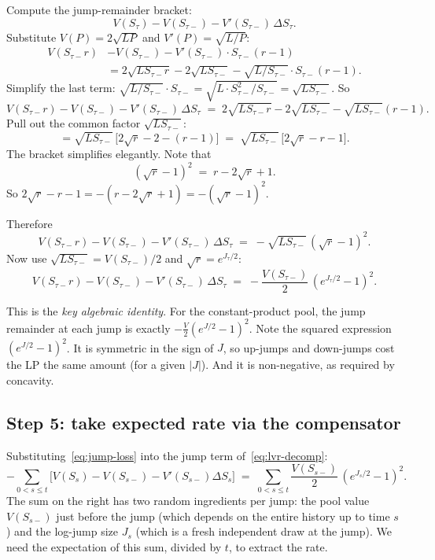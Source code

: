 \documentclass[11pt]{article}
\theoremstyle{definition}
\theoremstyle{remark}
\newcommand{\1}{\mathbf{1}}
\begin{document}
Compute the jump-remainder bracket:
\[
V(S_\tau) - V(S_{\tau-}) - V'(S_{\tau-})\,\Delta S_\tau.
\]
Substitute $V(P) = 2\sqrt{LP}$ and $V'(P) = \sqrt{L/P}$:
\begin{align*}
V(S_{\tau-} r) &- V(S_{\tau-}) - V'(S_{\tau-}) \cdot S_{\tau-}(r-1) \\
&= 2\sqrt{L S_{\tau-} r} - 2\sqrt{L S_{\tau-}} - \sqrt{L/S_{\tau-}}\cdot S_{\tau-}(r-1).
\end{align*}
Simplify the last term: $\sqrt{L/S_{\tau-}}\cdot S_{\tau-} = \sqrt{L \cdot S_{\tau-}^2 / S_{\tau-}} = \sqrt{L S_{\tau-}}$. So
\[
V(S_{\tau-} r) - V(S_{\tau-}) - V'(S_{\tau-})\,\Delta S_\tau \;=\; 2\sqrt{L S_{\tau-} r} - 2\sqrt{L S_{\tau-}} - \sqrt{L S_{\tau-}}(r - 1).
\]
Pull out the common factor $\sqrt{L S_{\tau-}}$:
\[
= \sqrt{L S_{\tau-}}\,\big[2\sqrt{r} - 2 - (r - 1)\big] \;=\; \sqrt{L S_{\tau-}}\,\big[2\sqrt{r} - r - 1\big].
\]
The bracket simplifies elegantly. Note that
\[
(\sqrt{r} - 1)^2 \;=\; r - 2\sqrt{r} + 1.
\]
So $2\sqrt{r} - r - 1 = -(r - 2\sqrt{r} + 1) = -(\sqrt{r} - 1)^2$.

Therefore
\[
V(S_{\tau-} r) - V(S_{\tau-}) - V'(S_{\tau-})\,\Delta S_\tau \;=\; -\sqrt{L S_{\tau-}}\,(\sqrt{r} - 1)^2.
\]
Now use $\sqrt{L S_{\tau-}} = V(S_{\tau-})/2$ and $\sqrt{r} = e^{J_\tau/2}$:
\begin{equation}\label{eq:jump-loss}
\boxed{V(S_{\tau-} r) - V(S_{\tau-}) - V'(S_{\tau-})\,\Delta S_\tau \;=\; -\frac{V(S_{\tau-})}{2}\,(e^{J_\tau/2} - 1)^2.}
\end{equation}

This is the \emph{key algebraic identity}. For the constant-product pool, the jump remainder at each jump is exactly $-\tfrac{V}{2}(e^{J/2} - 1)^2$. Note the squared expression $(e^{J/2} - 1)^2$. It is symmetric in the sign of $J$, so up-jumps and down-jumps cost the LP the same amount (for a given $|J|$). And it is non-negative, as required by concavity.

\subsection{Step 5: take expected rate via the compensator}

Substituting~\eqref{eq:jump-loss} into the jump term of~\eqref{eq:lvr-decomp}:
\begin{equation}\label{eq:jump-sum}
-\sum_{0 < s \le t}\!\Big[V(S_s) - V(S_{s-}) - V'(S_{s-})\Delta S_s\Big] \;=\; \sum_{0 < s \le t} \frac{V(S_{s-})}{2}\,(e^{J_s/2} - 1)^2.
\end{equation}
The sum on the right has two random ingredients per jump: the pool value $V(S_{s-})$ just before the jump (which depends on the entire history up to time $s$) and the log-jump size $J_s$ (which is a fresh independent draw at the jump). We need the expectation of this sum, divided by $t$, to extract the rate.
\end{document}
